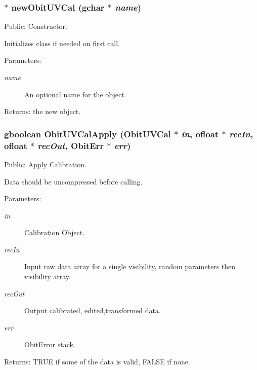 \subsubsection{$\ast$ new\-Obit\-UVCal (gchar $\ast$ {\em name})}\label{ObitUVCal_8h_a9}


Public: Constructor. 

Initializes class if needed on first call. \begin{Desc}
\item[Parameters:]
\begin{description}
\item[{\em name}]An optional name for the object. \end{description}
\end{Desc}
\begin{Desc}
\item[Returns:]the new object. \end{Desc}
\subsubsection{\setlength{\rightskip}{0pt plus 5cm}gboolean Obit\-UVCal\-Apply ({\bf Obit\-UVCal} $\ast$ {\em in}, {\bf ofloat} $\ast$ {\em rec\-In}, {\bf ofloat} $\ast$ {\em rec\-Out}, {\bf Obit\-Err} $\ast$ {\em err})}\label{ObitUVCal_8h_a14}


Public: Apply Calibration. 

Data should be uncompressed before calling. \begin{Desc}
\item[Parameters:]
\begin{description}
\item[{\em in}]Calibration Object. \item[{\em rec\-In}]Input raw data array for a single visibility, random parameters then visibility array. \item[{\em rec\-Out}]Output calibrated, edited,transformed data. \item[{\em err}]Obit\-Error stack. \end{description}
\end{Desc}
\begin{Desc}
\item[Returns:]TRUE if some of the data is valid, FALSE if none. \end{Desc}
